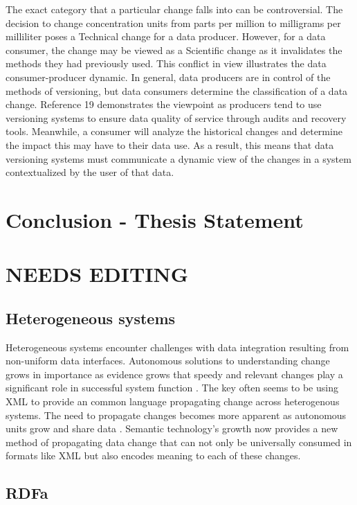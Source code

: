 The exact category that a particular change falls into can be controversial.
The decision to change concentration units from parts per million to milligrams per milliliter poses a Technical change for a data producer.
However, for a data consumer, the change may be viewed as a Scientific change as it invalidates the methods they had previously used.
This conflict in view illustrates the data consumer-producer dynamic.
In general, data producers are in control of the methods of versioning, but data consumers determine the classification of a data change.
Reference 19 demonstrates the viewpoint as producers tend to use versioning systems to ensure data quality of service through audits and recovery tools.
Meanwhile, a consumer will analyze the historical changes and determine the impact this may have to their data use.
As a result, this means that data versioning systems must communicate a dynamic view of the changes in a system contextualized by the user of that data.

\section{Conclusion - Thesis Statement}

\section{NEEDS EDITING}

\subsection{Heterogeneous systems}
Heterogeneous systems encounter challenges with data integration resulting from non-uniform data interfaces.
Autonomous solutions to understanding change grows in importance as evidence grows that speedy and relevant changes play a significant role in successful system function \cite{Bouzeghoub:2004:FAD:1012453.1012464}.
The key often seems to be using XML to provide an common language propagating change across heterogenous systems.
The need to propagate changes becomes more apparent as autonomous units grow and share data .
Semantic technology's growth now provides a new method of propagating data change that can not only be universally consumed in formats like XML but also encodes meaning to each of these changes.

\subsection{RDFa}

